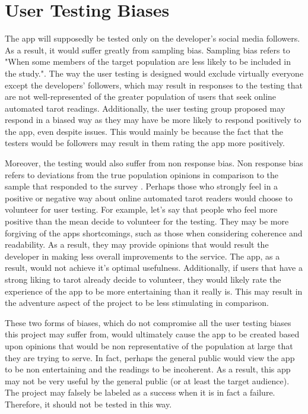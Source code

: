 \documentclass[10pt,twocolumn]{article}
\begin{document}
\section{User Testing Biases}
The app will supposedly be tested only on the developer's social media followers. As a result, it would suffer greatly from sampling bias. Sampling bias refers to "When some members of the target population are less likely to be included in the study."\cite{technology}. The way the user testing is designed would exclude virtually everyone except the developers' followers, which may result in responses to the testing that are not well-represented of the greater population of users that seek online automated tarot readings. Additionally, the user testing group proposed may respond in a biased way as they may have be more likely to respond positively to the app, even despite issues. This would mainly be because the fact that the testers would be followers may result in them rating the app more positively.

Moreover, the testing would also suffer from non response bias. Non response bias refers to deviations from the true population opinions in comparison to the sample that responded to the survey \cite{bose_2001}. Perhaps those who strongly feel in a positive or negative way about online automated tarot readers would choose to volunteer for user testing. For example, let's say that people who feel more positive than the mean decide to volunteer for the testing. They may be more forgiving of the apps shortcomings, such as those when considering coherence and readability. As a result, they may provide opinions that would result the developer in making less overall improvements to the service. The app, as a result, would not achieve it's optimal usefulness. Additionally, if users that have a strong liking to tarot already decide to volunteer, they would likely rate the experience of the app to be more entertaining than it really is. This may result in the adventure aspect of the project to be less stimulating in comparison. 

These two forms of biases, which do not compromise all the user testing biases this project may suffer from, would ultimately cause the app to be created based upon opinions that would be non representative of the population at large that they are trying to serve. In fact, perhaps the general public would view the app to be non entertaining and the readings to be incoherent. As a result, this app may not be very useful by the general public (or at least the target audience). The project may falsely be labeled as a success when it is in fact a failure. Therefore, it should not be tested in this way.
\end{document}
